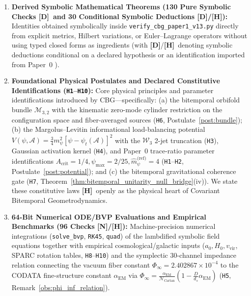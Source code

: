 \documentclass[11pt,a4paper]{article}
\newcommand{\catD}{\textbf{\textcolor{blue!75!black}{[D]}}}
\newcommand{\catH}{\textbf{\textcolor{orange!85!black}{[H]}}}
\newcommand{\catN}{\textbf{\textcolor{teal!75!black}{[N]}}}
\theoremstyle{definition}
\theoremstyle{remark}
\begin{document}
\begin{enumerate}
  \item[\catD] \textbf{Derived Symbolic Mathematical Theorems (130 Pure Symbolic Checks \catD\ and 30 Conditional Symbolic Deductions \catD/\catH):} Identities obtained symbolically inside \texttt{verify\_cbg\_paper1\_v13.py} directly from explicit metrics, Hilbert variations, or Euler--Lagrange operators without using typed closed forms as ingredients (with \catD/\catH\ denoting symbolic deductions conditional on a declared hypothesis or an identification imported from Paper~0 \cite{JV_Paper0}).
  \item[\catH] \textbf{Foundational Physical Postulates and Declared Constitutive Identifications (\texttt{H1}--\texttt{H10}):} Core physical principles and parameter identifications introduced by CBG---specifically: (a) the bitemporal orbifold bundle $\mathcal{M}_{3,2}$ with the kinematic zero-mode cylinder restriction on the configuration space and fiber-averaged sources (\texttt{H6}, Postulate~\ref{post:bundle}); (b) the Margolus--Levitin informational load-balancing potential $V(\psi, \mathcal{A}) = \frac{3}{4}m_{\psi}^2[\psi - \psi_t(\mathcal{A})]^2$ with the $\mathcal{W}_3$ 2-jet truncation (\texttt{H3}), Gaussian activation kernel (\texttt{H4}), and Paper~0 trace-ratio parameter identifications $A_{\text{crit}} = 1/4, \psi_{\max} = 2/25, \hat{m}_{\psi}^{\text{(ref)}} = 4$ (\texttt{H1}--\texttt{H2}, Postulate~\ref{post:potential}); and (c) the bitemporal gravitational coherence gate (\texttt{H7}, Theorem~\ref{thm:bitemporal_unitarity_null_bridge}(iv)). We state these constitutive laws \catH\ openly as the physical heart of Covariant Bitemporal Geometrodynamics.
  \item[\catN] \textbf{64-Bit Numerical ODE/BVP Evaluations and Empirical Benchmarks (96 Checks \catN/\catH):} Machine-precision numerical integrations (\texttt{solve\_bvp}, \texttt{RK45}, \texttt{quad}) of the lambdified symbolic field equations together with empirical cosmological/galactic inputs ($a_0, H_0, v_{\text{vir}}$, SPARC rotation tables, \texttt{H8}--\texttt{H10}) and the symplectic 30-channel impedance relation connecting the vacuum fiber constant $\Phi_{\infty} = 2.402867 \times 10^{-4}$ to the CODATA fine-structure constant $\alpha_{\text{EM}}$ via $\Phi_{\infty} = \frac{\alpha_{\text{EM}}}{\mathcal{N}_{\text{Cartan}}}(1 - \frac{D}{d_s}\alpha_{\text{EM}})$ (\texttt{H5}, Remark~\ref{obs:phi_inf_relation}).
\end{enumerate}

\end{document}
